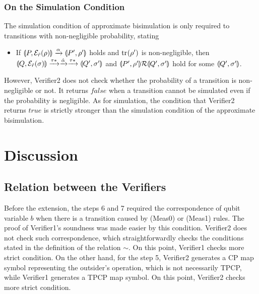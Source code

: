 \subsubsection{On the Simulation Condition}
The simulation condition of approximate bisimulation is only required
to transitions with non-negligible probability, stating
\begin{itemize}
 \item If $\llparenthesis P, \mathcal{E}_{\tilde r}(\rho) \rrparenthesis
       \xrightarrow{\alpha}
       \llparenthesis P', \rho' \rrparenthesis$ holds and ${\rm tr}_{}(\rho')$ is
       non-negligible, then\\
       $\llparenthesis Q, \mathcal{E}_{\tilde r}(\sigma) \rrparenthesis \xrightarrow{\tau*} \xrightarrow{\hat \alpha} \xrightarrow{\tau*}
       \llparenthesis Q', \sigma' \rrparenthesis$ and 
       $\llparenthesis P', \rho' \rrparenthesis \mathcal{R} \llparenthesis Q', \sigma' \rrparenthesis$ hold
       for some $\llparenthesis Q', \sigma' \rrparenthesis$.
\end{itemize}
However, Verifier2 does not check whether the probability of a
transition is non-negligible or not. It returns $\mathit{false}$
when a transition cannot be simulated even if the probability is
negligible. As for simulation,
the condition that Verifier2 returns $\mathit{true}$
is strictly stronger than the simulation condition of the approximate
bisimulation.

\section{Discussion}
\subsection{Relation between the Verifiers}
Before the extension, the steps 6 and 7 required the 
correspondence of qubit variable $b$ when there is a transition
caused by (Meas0) or (Meas1) rules.
The proof of Verifier1's soundness was made easier by this condition.
Verifier2 does not check such correspondence, which straightforwardly
checks the
conditions stated in the definition of the relation $\sim$.
On this point, Verifier1 checks more strict condition.
On the other hand, for the step 5, Verifier2
generates a CP map symbol representing the outsider's operation, which
is not necessarily TPCP, while Verifier1 generates a TPCP map symbol.
On this point, Verifier2 checks more strict condition.

